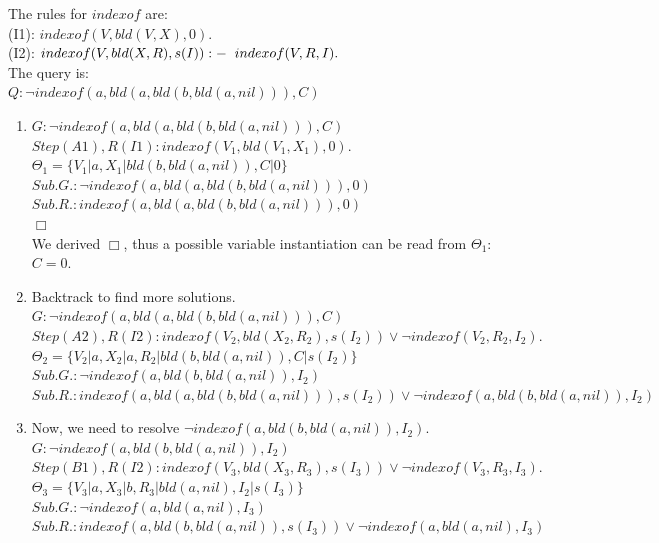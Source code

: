 \documentclass[10pt, a4paper]{article}
\begin{document}
The rules for $indexof$ are: \\
(I1): $indexof(V, bld(V, X), 0).$ \\
(I2): $indexof(V, bld(X, R), s(I)):- \hspace{0.2cm} indexof(V, R, I).$ \\

The query is: \\
$Q: \neg indexof(a, bld(a, bld(b, bld(a, nil))), C)$ \\

\begin{enumerate}
    \item $G: \neg indexof(a, bld(a, bld(b, bld(a, nil))), C)$ \\
    $Step(A1), R(I1): indexof(V_1, bld(V_1, X_1), 0).$ \\
    $\Theta_1 = \{V_1 | a, X_1 | bld(b, bld(a, nil)), C | 0\}$ \\
    $Sub.G.: \neg indexof(a, bld(a, bld(b, bld(a, nil))), 0)$ \\
    $Sub.R.: indexof(a, bld(a, bld(b, bld(a, nil))), 0)$    \\
    $\Box$ \\
    We derived $\Box$, thus a possible variable instantiation can be read from $\Theta_1$: $C = 0$.

    \item Backtrack to find more solutions. \\
    $G: \neg indexof(a, bld(a, bld(b, bld(a, nil))), C)$ \\
    $Step(A2), R(I2): indexof(V_2, bld(X_2, R_2), s(I_2)) \lor \neg indexof(V_2, R_2, I_2).$ \\
    $\Theta_2 = \{V_2 | a, X_2 | a, R_2 | bld(b, bld(a, nil)), C | s(I_2)\}$ \\
    $Sub.G.: \neg indexof(a, bld(b, bld(a, nil)), I_2)$ \\
    $Sub.R.: indexof(a, bld(a, bld(b, bld(a, nil))), s(I_2)) \lor \neg indexof(a, bld(b, bld(a, nil)), I_2)$

    \item Now, we need to resolve $\neg indexof(a, bld(b, bld(a, nil)), I_2)$. \\
    $G: \neg indexof(a, bld(b, bld(a, nil)), I_2)$ \\
    $Step(B1), R(I2): indexof(V_3, bld(X_3, R_3), s(I_3))  \lor \neg indexof(V_3, R_3, I_3).$ \\
    $\Theta_3 = \{V_3 | a, X_3 | b, R_3 | bld(a, nil), I_2 | s(I_3)\}$ \\
    $Sub.G.: \neg indexof(a, bld(a, nil), I_3)$ \\
    $Sub.R.: indexof(a, bld(b, bld(a, nil)), s(I_3)) \lor \neg indexof(a, bld(a, nil), I_3)$


\end{enumerate}
\end{document}
